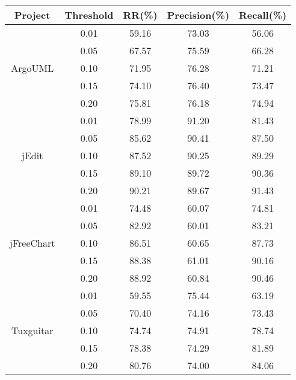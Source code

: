 \begin{table}[htbp]
\vspace{0.5em}\centering\wuhao
\begin{tabular}{ccccc}
\toprule[1.5pt]
\textbf{Project}&\textbf{Threshold}&\textbf{RR(\%)}&\textbf{Precision(\%)}&\textbf{Recall(\%)}\\
\midrule[1pt]
\multirow{5}{*}{ArgoUML}
&0.01&	59.16&	73.03&	56.06\\
&0.05&	67.57&	75.59&	66.28\\
&0.10&	71.95&	76.28&	71.21\\
&0.15&	74.10&	76.40&	73.47\\
&0.20&	75.81&	76.18&	74.94\\

\multirow{5}{*}{jEdit}
&0.01&	78.99&	91.20&	81.43\\
&0.05&	85.62&	90.41&	87.50\\
&0.10&	87.52&	90.25&	89.29\\
&0.15&	89.10&	89.72&	90.36\\
&0.20&	90.21&	89.67&	91.43\\

\multirow{5}{*}{jFreeChart}
&0.01&	74.48&	60.07&	74.81\\
&0.05&	82.92&	60.01&	83.21\\
&0.10&	86.51&	60.65&	87.73\\
&0.15&	88.38&	61.01&	90.16\\
&0.20&	88.92&	60.84&	90.46\\

\multirow{5}{*}{Tuxguitar}
&0.01&	59.55&	75.44&	63.19\\
&0.05&	70.40&	74.16&	73.43\\
&0.10&	74.74&	74.91&	78.74\\
&0.15&	78.38&	74.29&	81.89\\
&0.20&	80.76&	74.00&	84.06\\

\bottomrule[1.5pt]
\end{tabular}
\end{table}

